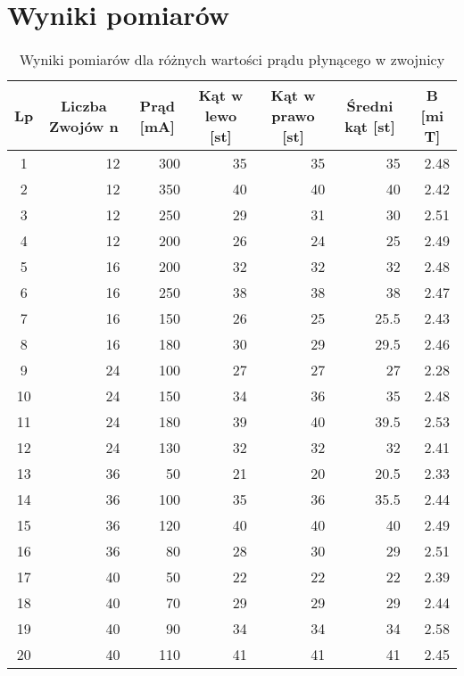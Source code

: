 \documentclass{article}
\begin{document}

 


\section{Wyniki pomiarów}

\begin{table}[htbp]
\centering
\begin{tabular}{|c|r|r|r|r|r|r|}
\hline
Lp & \multicolumn{1}{c|}{Liczba Zwojów n} & \multicolumn{1}{c|}{Prąd [mA]} & \multicolumn{1}{c|}{Kąt w lewo [st]} & \multicolumn{1}{c|}{Kąt w prawo [st]} & \multicolumn{1}{c|}{Średni kąt [st]} & \multicolumn{1}{c|}{B [mi T]} \\ \hline
1 & 12 & 300 & 35 & 35 & 35 & 2.48 \\ \hline
2 & 12 & 350 & 40 & 40 & 40 & 2.42 \\ \hline
3 & 12 & 250 & 29 & 31 & 30 & 2.51 \\ \hline
4 & 12 & 200 & 26 & 24 & 25 & 2.49 \\ \hline
5 & 16 & 200 & 32 & 32 & 32 & 2.48 \\ \hline
6 & 16 & 250 & 38 & 38 & 38 & 2.47 \\ \hline
7 & 16 & 150 & 26 & 25 & 25.5 & 2.43 \\ \hline
8 & 16 & 180 & 30 & 29 & 29.5 & 2.46 \\ \hline
9 & 24 & 100 & 27 & 27 & 27 & 2.28 \\ \hline
10 & 24 & 150 & 34 & 36 & 35 & 2.48 \\ \hline
11 & 24 & 180 & 39 & 40 & 39.5 & 2.53 \\ \hline
12 & 24 & 130 & 32 & 32 & 32 & 2.41 \\ \hline
13 & 36 & 50 & 21 & 20 & 20.5 & 2.33 \\ \hline
14 & 36 & 100 & 35 & 36 & 35.5 & 2.44 \\ \hline
15 & 36 & 120 & 40 & 40 & 40 & 2.49 \\ \hline
16 & 36 & 80 & 28 & 30 & 29 & 2.51\\ \hline
17 & 40 & 50 & 22 & 22 & 22 & 2.39\\ \hline
18 & 40 & 70 & 29 & 29 & 29 & 2.44 \\ \hline
19 & 40 & 90 & 34 & 34 & 34 & 2.58 \\ \hline
20 & 40 & 110 & 41 & 41 & 41 & 2.45 \\ \hline
\end{tabular}
\caption{Wyniki pomiarów dla różnych wartości prądu płynącego w zwojnicy}
\label{}
\end{table}
\newpage
\end{document}

